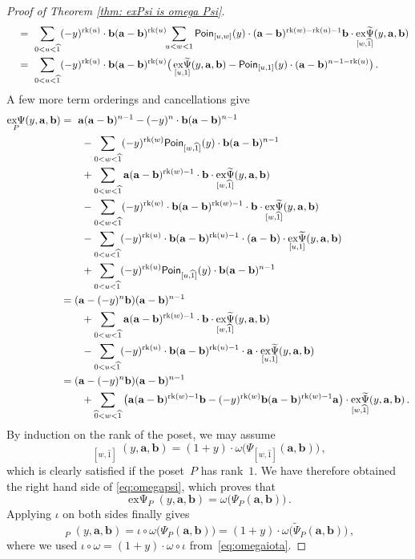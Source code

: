 \documentclass[a4paper, english,reqno, 11pt]{amsart}
\theoremstyle{plain}
\theoremstyle{definition}
\DeclareMathOperator{\rk}{rk}
\DeclareMathOperator{\expsi}{ex\Psi}
\DeclareMathOperator{\expsitilde}{ex\widetilde{\Psi}}
\newcommand{\zero}{\widehat{0}}
\newcommand{\one}{\widehat{1}}
\newcommand{\aaa}{\mathbf{a}}
\newcommand{\bbb}{\mathbf{b}}
\newcommand{\Poin}{\mathcal{\sf Poin}}
\begin{document}
\begin{proof}[Proof of Theorem \ref{thm: exPsi is omega Psi}]
\begin{align*}
        &\quad= \ \sum_{0 < u < \one} (-y)^{\rk(u)} \cdot \bbb (\aaa - \bbb)^{\rk(u)} 
            \!\! \sum_{u < w < 1} \Poin_{[u,w]}(y) \cdot (\aaa - \bbb)^{\rk(w) - \rk(u) -1} \bbb \cdot \expsitilde_{[w,\one]}(y,\aaa,\bbb)\\
        &\quad= \ \sum_{0 < u < \one} (-y)^{\rk(u)}\cdot \bbb (\aaa - \bbb)^{\rk(u)} 
            \big( \expsitilde_{[u,1]}(y,\aaa,\bbb) - \Poin_{[u,1]}(y) \cdot (\aaa-\bbb)^{n-1-\rk(u)} \big) \,.
    \end{align*}
    A few more term orderings and cancellations give
    \begin{align*}
    \expsi_P(y,\aaa,\bbb) 
    &= \ \aaa(\aaa - \bbb)^{n-1} - (-y)^n \cdot \bbb(\aaa - \bbb)^{n-1} \\
    &\qquad - \sum_{0 <w < \one} (-y)^{\rk(w)} \Poin_{[w,\one]}(y) \cdot \bbb(\aaa - \bbb)^{n-1} \\
    &\qquad + \sum_{0 < w <\one} \aaa(\aaa - \bbb)^{\rk(w)-1}\cdot \bbb \cdot \expsitilde_{[w,\one]}(y,\aaa,\bbb) \\
    &\qquad - \sum_{0 < w <\one} (-y)^{\rk(w)} \cdot \bbb (\aaa - \bbb)^{\rk(w)-1}\cdot \bbb \cdot \expsitilde_{[w,\one]}(y,\aaa,\bbb)\\
    &\qquad - \sum_{0 < u < \one} (-y)^{\rk(u)} \cdot \bbb (\aaa - \bbb)^{\rk(u) -1}\cdot (\aaa - \bbb) \cdot \expsitilde_{[u,1]}(y,\aaa,\bbb) \\
    &\qquad + \sum_{0 < u < \one} (-y)^{\rk(u)} \Poin_{[u,\one]}(y)\cdot \bbb (\aaa - \bbb)^{n-1}\\
    &= (\aaa- (-y)^n \bbb) (\aaa - \bbb)^{n-1} \\
    &\qquad + \sum_{0 < w <\one} \aaa(\aaa - \bbb)^{\rk(w)-1}\cdot \bbb \cdot \expsitilde_{[w,\one]}(y,\aaa,\bbb) \\
    &\qquad- \sum_{0 < u < \one} (-y)^{\rk(u)} \cdot \bbb (\aaa - \bbb)^{\rk(u) -1}\cdot \aaa \cdot \expsitilde_{[u,1]}(y,\aaa,\bbb) \\
    &= (\aaa-(-y)^n\bbb)(\aaa-\bbb)^{n-1} \\
    &\qquad +  \sum_{\zero < w < \one} 
        \big( \aaa(\aaa-\bbb)^{\rk(w) -1} \bbb - (-y)^{\rk(w)}  \bbb (\aaa-\bbb)^{\rk(w) -1} \aaa \big)  \cdot 
        \expsitilde_{[w,\one]}(y,\aaa,\bbb) \,.
\end{align*}
By induction on the rank of the poset, we may assume
\[
  \expsitilde_{[w,\one]}(y,\aaa,\bbb) = (1+y) \cdot \omega\big( \Psi_{[w,\one]}(\aaa,\bbb)\big)\,,
\]
which is clearly satisfied if the poset~$P$ has rank~$1$.
We have therefore obtained the right hand side of \eqref{eq:omegapsi}, which proves that %
\[
 \expsi_P(y, \aaa,\bbb) = \omega\big( \Psi_P(\aaa,\bbb )\big) \,.
\]
Applying $\iota$ on both sides finally gives
\[
    \expsitilde_P(y, \aaa,\bbb) = \iota \circ \omega\big( \Psi_P(\aaa,\bbb )\big)
     = (1+y) \cdot \omega\big( \widetilde \Psi_P(\aaa,\bbb )\big) \,,
\]
where we used $\iota \circ \omega = (1+y) \cdot \omega\circ \iota$ from~\eqref{eq:omegaiota}.
\end{proof}
\end{document}
